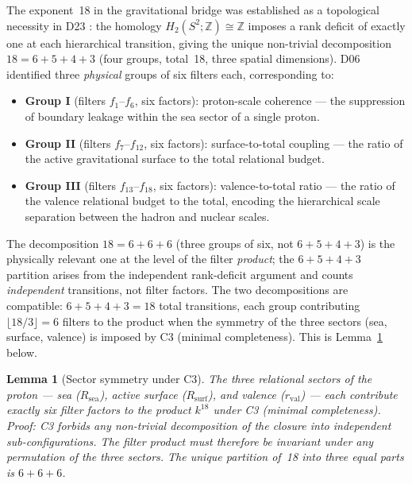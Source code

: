 \documentclass[12pt,a4paper]{article}
\theoremstyle{plain}
\newtheorem{lemma}[theorem]{Lemma}
\theoremstyle{definition}
\theoremstyle{remark}
\newcommand{\rval}{r_{\mathrm{val}}}
\newcommand{\Rsea}{R_{\mathrm{sea}}}
\newcommand{\Rsurf}{R_{\mathrm{surf}}}
\begin{document}
The exponent~18 in the gravitational bridge was established as a topological necessity in D23 \citep{D23}: the homology $H_2(S^2;\mathbb{Z})\cong\mathbb{Z}$ imposes a rank deficit of exactly one at each hierarchical transition, giving the unique non-trivial decomposition $18 = 6+5+4+3$ (four groups, total~18, three spatial dimensions). D06 \citep{D06} identified three \emph{physical} groups of six filters each, corresponding to:

\begin{itemize}[nosep]
\item \textbf{Group I} (filters $f_1$--$f_6$, six factors): proton-scale coherence --- the suppression of boundary leakage within the sea sector of a single proton.
\item \textbf{Group II} (filters $f_7$--$f_{12}$, six factors): surface-to-total coupling --- the ratio of the active gravitational surface to the total relational budget.
\item \textbf{Group III} (filters $f_{13}$--$f_{18}$, six factors): valence-to-total ratio --- the ratio of the valence relational budget to the total, encoding the hierarchical scale separation between the hadron and nuclear scales.
\end{itemize}

\noindent The decomposition $18 = 6+6+6$ (three groups of six, not $6+5+4+3$) is the physically relevant one at the level of the filter \emph{product}; the $6+5+4+3$ partition arises from the independent rank-deficit argument and counts \emph{independent} transitions, not filter factors. The two decompositions are compatible: $6+5+4+3 = 18$ total transitions, each group contributing $\lfloor 18/3 \rfloor = 6$ filters to the product when the symmetry of the three sectors (sea, surface, valence) is imposed by C3 (minimal completeness). This is Lemma~\ref{lem:symmetry} below.

\begin{lemma}[Sector symmetry under C3]
\label{lem:symmetry}
The three relational sectors of the proton --- sea ($\Rsea$), active surface ($\Rsurf$), and valence ($\rval$) --- each contribute exactly six filter factors to the product $k^{18}$ under C3 (minimal completeness). Proof: C3 forbids any non-trivial decomposition of the closure into independent sub-configurations. The filter product must therefore be invariant under any permutation of the three sectors. The unique partition of~18 into three equal parts is $6+6+6$.
\end{lemma}
\end{document}
